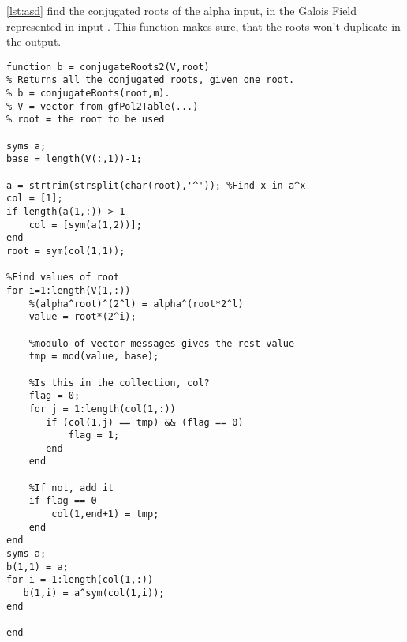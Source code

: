 \documentclass[Main]{subfiles}
\begin{document}
\codeTitle \ref{lst:asd} find the conjugated roots of the alpha input,  in the Galois Field represented in input .
This function makes sure, that the roots won't duplicate in the output.

\begin{lstlisting}[caption=Conjugate roots, style=Code-Matlab, label=lst:asd]
function b = conjugateRoots2(V,root)
% Returns all the conjugated roots, given one root.
% b = conjugateRoots(root,m).
% V = vector from gfPol2Table(...)
% root = the root to be used

syms a;
base = length(V(:,1))-1;

a = strtrim(strsplit(char(root),'^')); %Find x in a^x
col = [1];
if length(a(1,:)) > 1
    col = [sym(a(1,2))];
end
root = sym(col(1,1));

%Find values of root
for i=1:length(V(1,:))
    %(alpha^root)^(2^l) = alpha^(root*2^l)
    value = root*(2^i);
    
    %modulo of vector messages gives the rest value
	tmp = mod(value, base);
	
    %Is this in the collection, col?
	flag = 0;
    for j = 1:length(col(1,:))
       if (col(1,j) == tmp) && (flag == 0)
           flag = 1;
       end
    end
    
    %If not, add it
    if flag == 0
        col(1,end+1) = tmp;
	end
end
syms a;
b(1,1) = a;
for i = 1:length(col(1,:))
   b(1,i) = a^sym(col(1,i));
end

end
\end{lstlisting}
\end{document}
